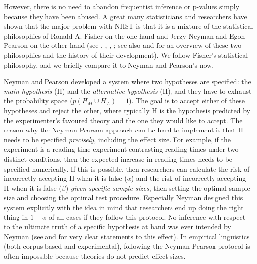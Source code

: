 However, there is no need to abandon frequentist inference or p-values simply because they have been abused.
A great many statisticians and researchers have shown that the major problem with NHST is that it is a mixture of the statistical philosophies of Ronald A. Fisher on the one hand and Jerzy Neyman and Egon Pearson on the other hand (see \citealt{Goodman2008}, \citealt{Perezgonzalez2014}, \citealt{Perezgonzalez2015}, \citealt{GreenlandEa2016}; see also \citealt{Lehmann1993} and \citealt{Lehmann2011} for an overview of these two philosophies and the history of their development).
We follow Fisher's statistical philosophy, and we briefly compare it to Neyman and Pearson's now.

Neyman and Pearson developed a system where two hypotheses are specified:
the \textit{main hypothesis} (H) and the \textit{alternative hypothesis} (H), and they have to exhaust the probability space ($p(H_M\cup H_A)=1$).
The goal is to accept either of these hypotheses and reject the other, where typically H is the hypothesis predicted by the experimenter's favoured theory and the one they would like to accept.
The reason why the Neyman-Pearson approach can be hard to implement is that H needs to be specified \textit{precisely}, \ie including the effect size.
For example, if the experiment is a reading time experiment contrasting reading times under two distinct conditions, then the expected increase in reading times needs to be specified numerically.
If this is possible, then researchers can calculate the risk of incorrectly accepting H when it is false ($\alpha$) and the risk of incorrectly accepting H when it is false ($\beta$) \textit{given specific sample sizes}, then setting the optimal sample size and choosing the optimal test procedure.
Especially Neyman designed this system explicitly with the idea in mind that researchers end up doing the right thing in $1-\alpha$ of all cases if they follow this protocol.
No inference with respect to the ultimate truth of a specific hypothesis at hand was ever intended by Neyman (see \citealt[290--291]{NeymanPearson1933} and \citealt[349]{Neyman1937} for very clear statements to this effect).
In empirical linguistics (both corpus-based and experimental), following the Neyman-Pearson protocol is often impossible because theories do not predict effect sizes.

